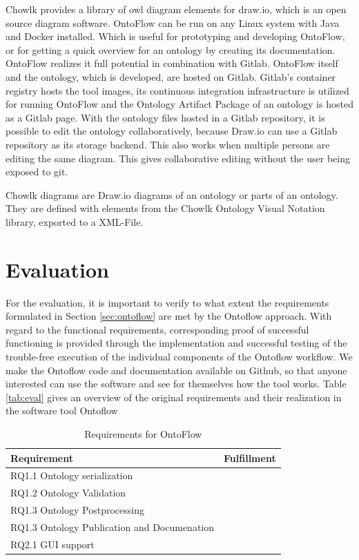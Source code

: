 \documentclass[sigconf]{acmart}
\begin{document}
Chowlk provides a library of owl diagram elements for draw.io, which is an open source diagram software.
OntoFlow can be run on any Linux system with Java and Docker installed.
Which is useful for prototyping and developing OntoFlow, or for getting a quick overview for an ontology by creating its documentation.
OntoFlow realizes it full potential in combination with Gitlab.
OntoFlow itself and the ontology, which is developed, are hosted on Gitlab.
Gitlab's container registry hosts the tool images, its continuous integration infrastructure is utilized for running OntoFlow and the Ontology Artifact Package of an ontology is hosted as a Gitlab page.
With the ontology files hosted in a Gitlab repository, it is possible to edit the ontology collaboratively, because Draw.io can use a Gitlab repository as its storage backend.
This also works when multiple persons are editing the same diagram.
This gives collaborative editing without the user being exposed to git.

Chowlk diagrams are Draw.io diagrams of an ontology or parts of an ontology.
They are defined with elements from the Chowlk Ontology Visual Notation library, exported to a XML-File.


\section{Evaluation}

For the evaluation, it is important to verify to what extent the requirements formulated in Section \ref{sec:ontoflow} are met by the Ontoflow approach. With regard to the functional requirements, corresponding proof of successful functioning is provided through the implementation and successful testing of the trouble-free execution of the individual components of the Ontoflow workflow. We make the Ontoflow code and documentation available on Github, so that anyone interested can use the software and see for themselves how the tool works. Table \ref{tab:eval} gives an overview of the original requirements and their realization in the software tool Ontoflow

\begin{table}[htb]
\begin{tabular}{@{}ll@{}}
\toprule
Requirement &
Fulfillment \\ \midrule
  RQ1.1 Ontology serialization & \\
  RQ1.2 Ontology Validation & \\
  RQ1.3 Ontology Postprocessing & \\
  RQ1.3 Ontology Publication and Documenation & \\
  RQ2.1 GUI support & \\
\hline
\end{tabular}
\label{tab:req}
\caption{Requirements for OntoFlow}
\end{table}
\end{document}
